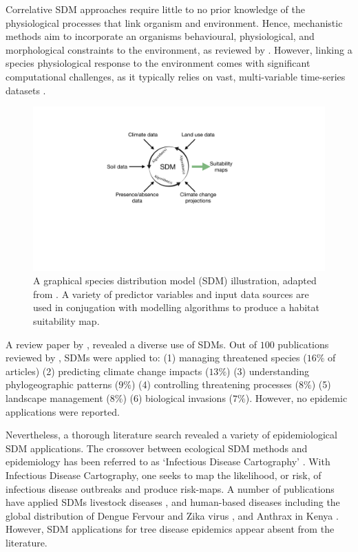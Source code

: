 Correlative SDM approaches require little to no prior knowledge of the physiological processes that link organism and environment.
Hence, mechanistic methods aim to incorporate an organisms behavioural, physiological, and morphological constraints to the environment, 
as reviewed by \cite{kearney2009mechanistic}. However, linking a species physiological response to the environment comes with significant
computational challenges, as it typically relies on vast, multi-variable time-series datasets \cite{shabani2016comparison}.

\begin{figure}
    \centering
    \includegraphics[scale=0.35]{chapter2/figures/SDM-fig.pdf}
    \caption{A graphical species distribution model (SDM) illustration, adapted from \cite{SDM_1}. A variety of predictor variables and input data sources are used in conjugation with modelling algorithms to produce a habitat suitability map.}
   \label{fig:sdm}
\end{figure}

A review paper by \cite{guillera2015my}, revealed a diverse use of SDMs.
Out of $100$ publications reviewed by \cite{guillera2015my}, SDMs were applied to: 
(1) managing threatened species ($16\% $ of articles) 
(2) predicting climate change impacts ($13\%$) 
(3) understanding phylogeographic patterns ($9\%$) 
(4) controlling threatening processes ($8\%$) 
(5) landscape management ($8\%$) 
(6) biological invasions ($7\%$). However, no epidemic applications were reported.

Nevertheless, a thorough literature search revealed a variety of epidemiological SDM applications.
The crossover between ecological SDM methods and epidemiology has been referred to as `Infectious Disease Cartography' \cite{KRAEMER201619}.
With Infectious Disease Cartography, one seeks to map the likelihood, or risk, of infectious disease outbreaks and produce risk-maps.
A number of publications have applied SDMs livestock diseases \cite{hollings2017species}, and human-based diseases including the global 
distribution of Dengue Fervour \cite{bhatt2013global} and Zika virus \cite{messina2016mapping}, and Anthrax in Kenya \cite{otieno2021modeling}.
However, SDM applications for tree disease epidemics appear absent from the literature.

